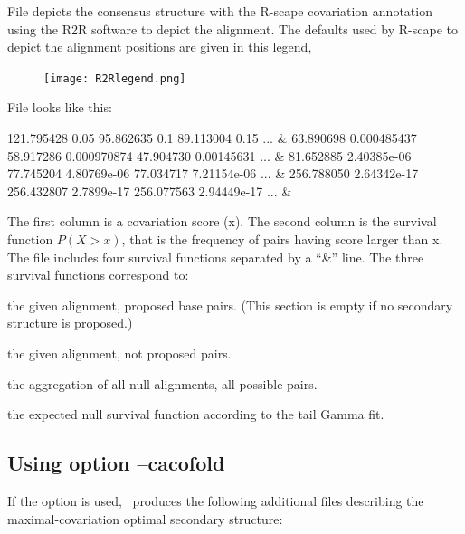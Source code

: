  File  depicts the
 consensus structure with the R-scape covariation annotation using the
 R2R software to depict the alignment.  The defaults used by R-scape
 to depict the alignment positions are given in this legend,

\begin{figure}[h]
   \begin{center}
   \texttt{[image: R2Rlegend.png]} 
  \end{center}
\end{figure}
 
 File  looks like this:

 \begin{sreoutput}
121.795428      0.05
95.862635       0.1
89.113004       0.15
...
 &
63.890698       0.000485437
58.917286       0.000970874
47.904730       0.00145631
...
 &
81.652885       2.40385e-06
77.745204       4.80769e-06
77.034717       7.21154e-06
...
 &
256.788050      2.64342e-17
256.432807      2.7899e-17
256.077563      2.94449e-17
...
 &
 \end{sreoutput}
 The first column is a covariation score (x). The second column is the
 survival function $P(X > x)$, that is the frequency of pairs having
 score larger than x. The file includes four survival functions separated by a
 ``\&'' line. The three survival functions correspond to:

 \begin{sreitems}{}
 \item[\prog{First functions:}] the given alignment, proposed base pairs.
 (This section is empty if no secondary structure is proposed.)
 \item[\prog{Second functions:}] the given alignment, not proposed pairs.
 \item[\prog{Third function:}] the aggregation of all null alignments, all possible pairs.
 \item[\prog{Fourth function:}] the expected null survival function according to the tail Gamma fit.
 \end{sreitems}

\subsection{Using option --cacofold}
If the option  is used, \rscape\, produces the
following additional files describing the maximal-covariation optimal
secondary structure:

